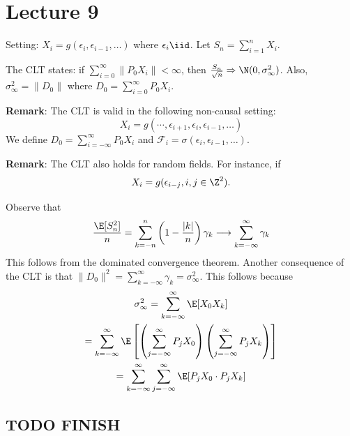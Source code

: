 \section{Lecture 9}

Setting: \(X_i = g(\epsilon_i, \epsilon_{i-1}, \dots)\) where \(\epsilon_i \iid\). Let \(S_n = \sum_{i=1}^n X_i\).

The CLT states: if \(\sum_{i=0}^\infty \|P_0 X_i\| < \infty\), then \(\frac{S_n}{\sqrt{n}} \Rightarrow \N(0, \sigma^2_\infty)\). Also, \(\sigma^2_\infty = \|D_0\|\) where \(D_0 = \sum_{i=0}^\infty P_0 X_i\).

\textbf{Remark}: The CLT is valid in the following non-causal setting:
\[X_i = g(\cdots, \epsilon_{i+1}, \epsilon_i, \epsilon_{i-1}, \dots)\]
We define \(D_0 = \sum_{i=-\infty}^\infty P_0 X_i\) and \(\mathcal F_i = \sigma(\epsilon_i, \epsilon_{i-1}, \dots)\).

\textbf{Remark}: The CLT also holds for random fields. For instance, if
\[X_i = g(\epsilon_{i - j}, i, j \in \Z^2).\]

Observe that
\[\frac{\E[S_n^2]}{n} = \sum_{k=-n}^n \left(1 - \frac{|k|}{n}\right)\gamma_k \longrightarrow \sum_{k=-\infty}^\infty \gamma_k\]
This follows from the dominated convergence theorem. Another consequence of the CLT is that \(\|D_0\|^2 = \sum_{k=-\infty}^\infty \gamma_k = \sigma^2_\infty\). This follows because
\[\begin{gathered}\sigma^2_\infty = \sum_{k=-\infty}^\infty \E[X_0 X_k] \\
= \sum_{k=-\infty}^\infty \E\left[ \left(\sum_{j=-\infty}^\infty P_j X_0\right)\left(\sum_{j=-\infty}^\infty P_j X_k\right) \right] \\
= \sum_{k=-\infty}^\infty \sum_{j=-\infty}^\infty \E[P_j X_0 \cdot P_j X_k] \end{gathered}\]

\subsection*{TODO FINISH}